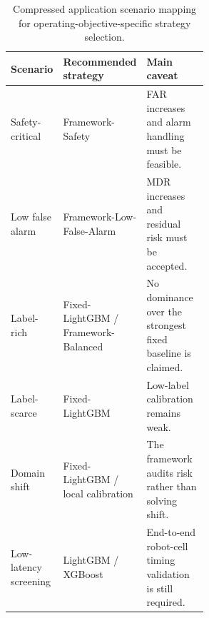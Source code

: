 
\begin{table}[!htbp]
\centering
\footnotesize
\setlength{\tabcolsep}{4pt}
\renewcommand{\arraystretch}{1.10}
\caption{Compressed application scenario mapping for operating-objective-specific strategy selection.}
\label{tab:application-scenario}
\begin{tabularx}{\linewidth}{@{}>{\RaggedRight\arraybackslash}p{0.25\linewidth}>{\RaggedRight\arraybackslash}p{0.30\linewidth}>{\RaggedRight\arraybackslash}X@{}}
\toprule
Scenario & Recommended strategy & Main caveat \\
\midrule
Safety-critical & Framework-Safety & FAR increases and alarm handling must be feasible. \\
Low false alarm & Framework-Low-False-Alarm & MDR increases and residual risk must be accepted. \\
Label-rich & Fixed-LightGBM / Framework-Balanced & No dominance over the strongest fixed baseline is claimed. \\
Label-scarce & Fixed-LightGBM & Low-label calibration remains weak. \\
Domain shift & Fixed-LightGBM / local calibration & The framework audits risk rather than solving shift. \\
Low-latency screening & LightGBM / XGBoost & End-to-end robot-cell timing validation is still required. \\
\bottomrule
\end{tabularx}
\end{table}
